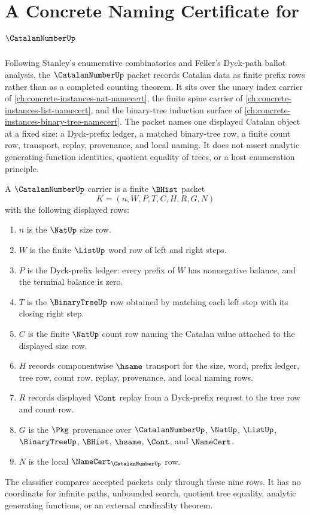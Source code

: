 \chapter{A Concrete Naming Certificate for $\CatalanNumberUp$}
\label{ch:concrete-instances-catalan-number-namecert}

Following Stanley's enumerative combinatorics and Feller's Dyck-path ballot analysis, the $\CatalanNumberUp$ packet records Catalan data as finite prefix rows rather than as a completed counting theorem. It sits over the unary index carrier of \autoref{ch:concrete-instances-nat-namecert}, the finite spine carrier of \autoref{ch:concrete-instances-list-namecert}, and the binary-tree induction surface of \autoref{ch:concrete-instances-binary-tree-namecert}. The packet names one displayed Catalan object at a fixed size: a Dyck-prefix ledger, a matched binary-tree row, a finite count row, transport, replay, provenance, and local naming. It does not assert analytic generating-function identities, quotient equality of trees, or a host enumeration principle.

\begin{definition}
\label{def:catalan-number-carrier}
A $\CatalanNumberUp$ carrier is a finite $\BHist$ packet
$$
K=(n,W,P,T,C,H,R,G,N)
$$
with the following displayed rows:
\begin{enumerate}
\item $n$ is the $\NatUp$ size row.
\item $W$ is the finite $\ListUp$ word row of left and right steps.
\item $P$ is the Dyck-prefix ledger: every prefix of $W$ has nonnegative balance, and the terminal balance is zero.
\item $T$ is the $\BinaryTreeUp$ row obtained by matching each left step with its closing right step.
\item $C$ is the finite $\NatUp$ count row naming the Catalan value attached to the displayed size row.
\item $H$ records componentwise $\hsame$ transport for the size, word, prefix ledger, tree row, count row, replay, provenance, and local naming rows.
\item $R$ records displayed $\Cont$ replay from a Dyck-prefix request to the tree row and count row.
\item $G$ is the $\Pkg$ provenance over $\CatalanNumberUp$, $\NatUp$, $\ListUp$, $\BinaryTreeUp$, $\BHist$, $\hsame$, $\Cont$, and $\NameCert$.
\item $N$ is the local $\NameCert_{\CatalanNumberUp}$ row.
\end{enumerate}
The classifier compares accepted packets only through these nine rows. It has no coordinate for infinite paths, unbounded search, quotient tree equality, analytic generating functions, or an external cardinality theorem.
\end{definition}


